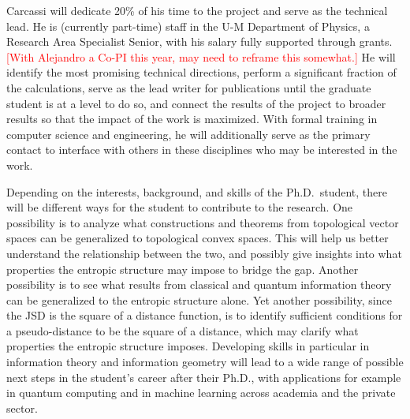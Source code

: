 Carcassi will dedicate 20\% of his time to the project and serve as the technical lead.  He is (currently part-time) staff in the U-M Department of Physics, a Research Area Specialist Senior, with his salary fully supported through grants.  \textcolor{red}{[With Alejandro a Co-PI this year, may need to reframe this somewhat.]} He will identify the most promising technical directions, perform a significant fraction of the calculations, serve as the lead writer for publications until the graduate student is at a level to do so, and connect the results of the project to broader results so that the impact of the work is maximized.  With formal training in computer science and engineering, he will additionally serve as the primary contact to interface with others in these disciplines who may be interested in the work.

Depending on the interests, background, and skills of the Ph.D.~student, there will be different ways for the student to contribute to the research. One possibility is to analyze what constructions and theorems from topological vector spaces can be generalized to topological convex spaces. This will help us better understand the relationship between the two, and possibly give insights into what properties the entropic structure may impose to bridge the gap. Another possibility is to see what results from classical and quantum information theory can be generalized to the entropic structure alone. Yet another possibility, since the JSD is the square of a distance function, is to identify sufficient conditions for a pseudo-distance to be the square of a distance, which may clarify what properties the entropic structure imposes. Developing skills in particular in information theory and information geometry will lead to a wide range of possible next steps in the student's career after their Ph.D., with applications for example in quantum computing and in machine learning across academia and the private sector.






